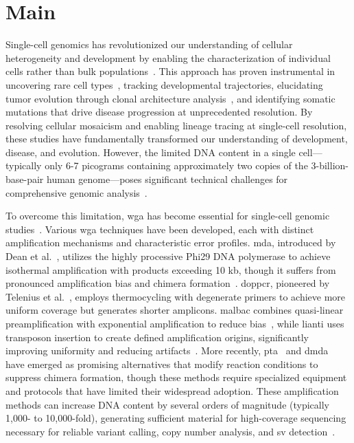 \documentclass[pdflatex,sn-nature,lineno]{sn-jnl}%
\theoremstyle{thmstyleone}%
\theoremstyle{thmstyletwo}%
\theoremstyle{thmstylethree}%
\begin{document}
\maketitle

\section*{Main}\label{sec:main}

Single-cell genomics has revolutionized our understanding of cellular heterogeneity and development by enabling the characterization of individual cells rather than bulk populations~\cite{kalef2024single,sun2024mapping,navin2011tumour,macaulay2014single}.
This approach has proven instrumental in uncovering rare cell types~\cite{macaulay2014single}, tracking developmental trajectories, elucidating tumor evolution through clonal architecture analysis~\cite{navin2011tumour}, and identifying somatic mutations that drive disease progression at unprecedented resolution.
By resolving cellular mosaicism and enabling lineage tracing at single-cell resolution, these studies have fundamentally transformed our understanding of development, disease, and evolution.
However, the limited DNA content in a single cell—typically only 6-7 picograms containing approximately two copies of the 3-billion-base-pair human genome—poses significant technical challenges for comprehensive genomic analysis~\cite{leung2016highly,gawad2016single,chen2017singlecell}.

To overcome this limitation, \gls{wga} has become essential for single-cell genomic studies~\cite{zong2012genome,huang2015single,dean2002comprehensive, chen2017singlecell,macaulay2014single}.
Various \gls{wga} techniques have been developed, each with distinct amplification mechanisms and characteristic error profiles.
\gls{mda}, introduced by Dean et al.~\cite{dean2002comprehensive}, utilizes the highly processive Phi29 DNA polymerase to achieve isothermal amplification with products exceeding 10 kb, though it suffers from pronounced amplification bias and chimera formation~\cite{lasken2007mechanism,pinard2006assessment}.
\gls{doppcr}, pioneered by Telenius et al.~\cite{telenius1992degenerate}, employs thermocycling with degenerate primers to achieve more uniform coverage but generates shorter amplicons.
\gls{malbac} combines quasi-linear preamplification with exponential amplification to reduce bias~\cite{zong2012genome}, while \gls{lianti} uses transposon insertion to create defined amplification origins, significantly improving uniformity and reducing artifacts~\cite{chen2017singlecell}.
More recently, \gls{pta}~\cite{gonzalez-pena2021accurate} and \gls{dmda}~\cite{dippenaar2024droplet} have emerged as promising alternatives that modify reaction conditions to suppress chimera formation, though these methods require specialized equipment and protocols that have limited their widespread adoption.
These amplification methods can increase DNA content by several orders of magnitude (typically 1,000- to 10,000-fold), generating sufficient material for high-coverage sequencing necessary for reliable variant calling, copy number analysis, and \gls{sv} detection~\cite{macaulay2014single,de2014quantitative, biezuner2021comparison,fu2015uniform,agyabeng2025evaluating,dean2001rapid}.
\end{document}
